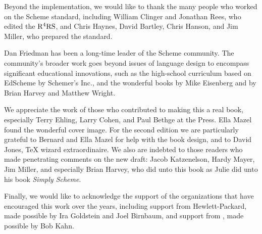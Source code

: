 Beyond the  implementation, we would like to thank the many people
who worked on the  Scheme standard, including William Clinger and
Jonathan Rees, who edited the \( \rm R^4RS \), and Chris Haynes, David Bartley,
Chris Hanson, and Jim Miller, who prepared the  standard.

Dan Friedman has been a long-time leader of the Scheme community.  The
community's broader work goes beyond issues of language design to encompass
significant educational innovations, such as the high-school curriculum based
on EdScheme by Schemer's Inc., and the wonderful books by Mike Eisenberg and by
Brian Harvey and Matthew Wright.

We appreciate the work of those who contributed to making this a real book,
especially Terry Ehling, Larry Cohen, and Paul Bethge at the 
Press.  Ella Mazel found the wonderful cover image.  For the second edition we
are particularly grateful to Bernard and Ella Mazel for help with the book
design, and to David Jones, {\TeX} wizard extraordinaire.  We also are indebted
to those readers who made penetrating comments on the new draft: Jacob
Katzenelson, Hardy Mayer, Jim Miller, and especially Brian Harvey, who did unto
this book as Julie did unto his book \textit{Simply Scheme}.

Finally, we would like to acknowledge the support of the organizations that
have encouraged this work over the years, including support from
Hewlett-Packard, made possible by Ira Goldstein and Joel Birnbaum, and support
from , made possible by Bob Kahn.
